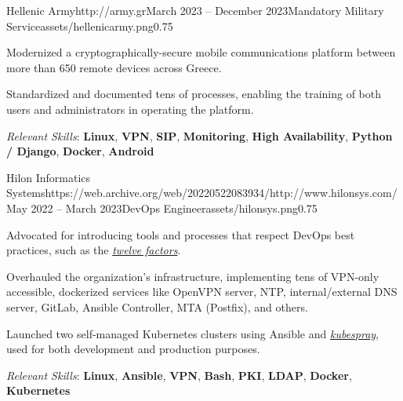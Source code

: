 \documentclass{mycv}
\begin{document}
	\vspace{0.5cm}

	\begin{EntryDatedLogo}{Hellenic Army}{http://army.gr}{March 2023 -- December 2023}{Mandatory Military Service}{assets/hellenicarmy.png}{0.75}
		\begin{Itemize}
			\item Modernized a cryptographically-secure mobile communications platform between more than 650 remote devices across Greece.
			\item Standardized and documented tens of processes, enabling the training of both users and administrators in operating the platform.
		\end{Itemize}
		\vspace{-0.3cm}
		\textit{Relevant Skills}: \textbf{Linux}, \textbf{VPN}, \textbf{SIP}, \textbf{Monitoring}, \textbf{High Availability}, \textbf{Python / Django}, \textbf{Docker}, \textbf{Android}
	\end{EntryDatedLogo}

	\vspace{0.5cm}

	\begin{EntryDatedLogo}{Hilon Informatics Systems}{https://web.archive.org/web/20220522083934/http://www.hilonsys.com/}{May 2022 -- March 2023}{DevOps Engineer}{assets/hilonsys.png}{0.75}
		\begin{Itemize}
			\item Advocated for introducing tools and processes that respect DevOps best practices, such as the \href{https://12factor.net/}{\textit{twelve factors}}.
			\item Overhauled the organization's infrastructure, implementing tens of VPN-only accessible, dockerized services like OpenVPN server, NTP, internal/external DNS server, GitLab, Ansible Controller, MTA (Postfix), and others.
			\item Launched two self-managed Kubernetes clusters using Ansible and \href{https://kubespray.io/}{\textit{kubespray}}, used for both development and production purposes.
		\end{Itemize}
		\vspace{-0.3cm}
		\textit{Relevant Skills}: \textbf{Linux}, \textbf{Ansible}, \textbf{VPN}, \textbf{Bash}, \textbf{PKI}, \textbf{LDAP}, \textbf{Docker}, \textbf{Kubernetes}
	\end{EntryDatedLogo}

	\vspace{0.5cm}
\end{document}
